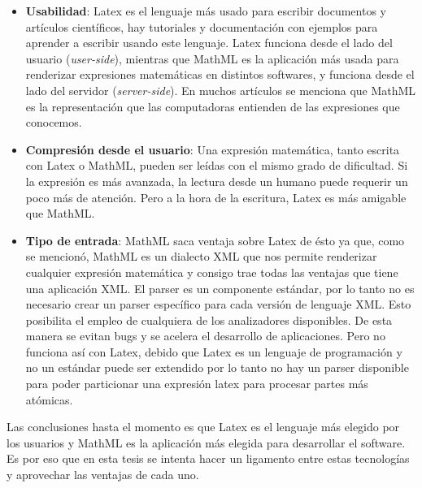 \begin{itemize}
\item \textbf{Usabilidad}: Latex es el lenguaje más usado para escribir documentos y artículos científicos, hay tutoriales y documentación con ejemplos para aprender a escribir usando este lenguaje. Latex funciona desde el lado del usuario (\textit{user-side}), mientras que MathML es la aplicación más usada para renderizar expresiones matemáticas en distintos softwares, y funciona desde el lado del servidor (\textit{server-side}). En muchos artículos se menciona que MathML es la representación que las computadoras entienden de las expresiones que conocemos.
\item \textbf{Compresión desde el usuario}: Una expresión matemática, tanto escrita con Latex o MathML, pueden ser leídas con el mismo grado de dificultad. Si la expresión es más avanzada, la lectura desde un humano puede requerir un poco más de atención. Pero a la hora de la escritura, Latex es más amigable que MathML.
\item \textbf{Tipo de entrada}: MathML saca ventaja sobre Latex de ésto ya que, como se mencionó, MathML es un dialecto XML que nos permite renderizar cualquier expresión matemática y consigo trae todas las ventajas que tiene una aplicación XML. El parser es un componente estándar, por lo tanto no es necesario crear un parser específico para cada versión de lenguaje XML. Esto posibilita el empleo de cualquiera de los analizadores disponibles. De esta manera se evitan bugs y se acelera el desarrollo de aplicaciones. Pero no funciona así con Latex, debido que Latex es un lenguaje de programación y no un estándar puede ser extendido por lo tanto no hay un parser disponible para poder particionar una expresión latex para procesar partes más atómicas.
\end{itemize}

Las conclusiones hasta el momento es que Latex es el lenguaje más elegido por los usuarios y MathML es la aplicación más elegida para desarrollar el software. Es por eso que en esta tesis se intenta hacer un ligamento entre estas tecnologías y aprovechar las ventajas de cada uno.
